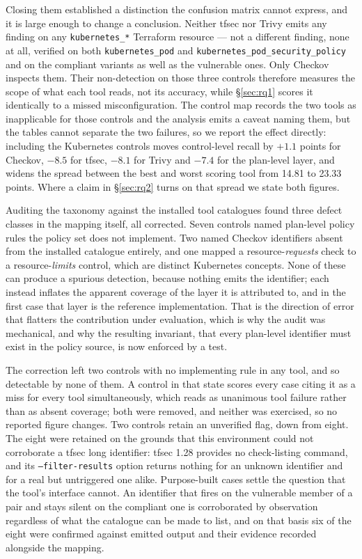 \documentclass[smallextended]{svjour3}
\begin{document}
Closing them established a distinction the confusion matrix cannot express, and it
is large enough to change a conclusion. Neither tfsec nor Trivy emits any finding
on any \texttt{kubernetes\_*} Terraform resource --- not a different finding, none
at all, verified on both \texttt{kubernetes\_pod} and
\texttt{kubernetes\_pod\_security\_policy} and on the compliant variants as well as
the vulnerable ones. Only Checkov inspects them. Their non-detection on those three
controls therefore measures the scope of what each tool reads, not its accuracy,
while \S\ref{sec:rq1} scores it identically to a missed misconfiguration. The
control map records the two tools as inapplicable for those controls and the
analysis emits a caveat naming them, but the tables cannot separate the two
failures, so we report the effect directly: including the Kubernetes controls
moves control-level recall by $+1.1$ points for Checkov, $-8.5$ for tfsec, $-8.1$
for Trivy and $-7.4$ for the plan-level layer, and widens the spread between the
best and worst scoring tool from 14.81 to 23.33 points. Where a claim in
\S\ref{sec:rq2} turns on that spread we state both figures.

Auditing the taxonomy against the installed tool catalogues found three defect
classes in the mapping itself, all corrected. Seven controls named plan-level
policy rules the policy set does not implement. Two named Checkov identifiers
absent from the installed catalogue entirely, and one mapped a
resource-\emph{requests} check to a resource-\emph{limits} control, which are
distinct Kubernetes concepts. None of these can produce a spurious detection,
because nothing emits the identifier; each instead inflates the apparent coverage
of the layer it is attributed to, and in the first case that layer is the
reference implementation. That is the direction of error that flatters the
contribution under evaluation, which is why the audit was mechanical, and why the
resulting invariant, that every plan-level identifier must exist in the policy
source, is now enforced by a test.

The correction left two controls with no implementing rule in any tool, and so
detectable by none of them. A control in that state scores every case citing it
as a miss for every tool simultaneously, which reads as unanimous tool failure
rather than as absent coverage; both were removed, and neither was exercised, so
no reported figure changes. Two controls retain an unverified flag, down from
eight. The eight were retained on the grounds that this environment could not
corroborate a tfsec long identifier: tfsec 1.28 provides no check-listing command,
and its \texttt{--filter-results} option returns nothing for an unknown identifier
and for a real but untriggered one alike. Purpose-built cases settle the question
that the tool's interface cannot. An identifier that fires on the vulnerable member
of a pair and stays silent on the compliant one is corroborated by observation
regardless of what the catalogue can be made to list, and on that basis six of the
eight were confirmed against emitted output and their evidence recorded alongside
the mapping.
\end{document}
